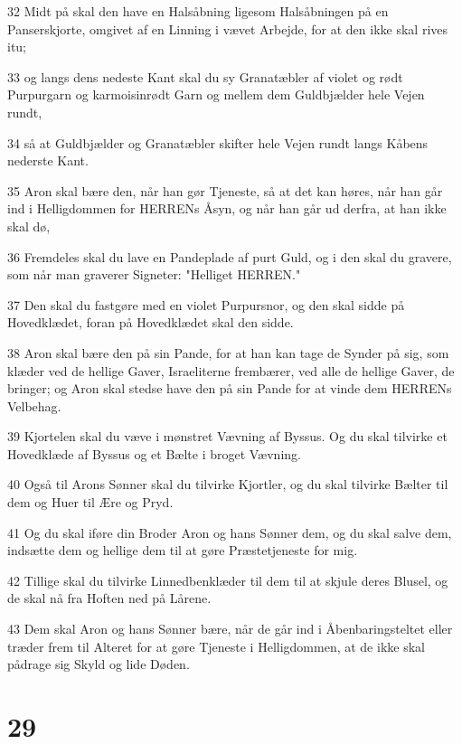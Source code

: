\par 32 Midt på skal den have en Halsåbning ligesom Halsåbningen på en Panserskjorte, omgivet af en Linning i vævet Arbejde, for at den ikke skal rives itu;
\par 33 og langs dens nedeste Kant skal du sy Granatæbler af violet og rødt Purpurgarn og karmoisinrødt Garn og mellem dem Guldbjælder hele Vejen rundt,
\par 34 så at Guldbjælder og Granatæbler skifter hele Vejen rundt langs Kåbens nederste Kant.
\par 35 Aron skal bære den, når han gør Tjeneste, så at det kan høres, når han går ind i Helligdommen for HERRENs Åsyn, og når han går ud derfra, at han ikke skal dø,
\par 36 Fremdeles skal du lave en Pandeplade af purt Guld, og i den skal du gravere, som når man graverer Signeter: "Helliget HERREN."
\par 37 Den skal du fastgøre med en violet Purpursnor, og den skal sidde på Hovedklædet, foran på Hovedklædet skal den sidde.
\par 38 Aron skal bære den på sin Pande, for at han kan tage de Synder på sig, som klæder ved de hellige Gaver, Israeliterne frembærer, ved alle de hellige Gaver, de bringer; og Aron skal stedse have den på sin Pande for at vinde dem HERRENs Velbehag.
\par 39 Kjortelen skal du væve i mønstret Vævning af Byssus. Og du skal tilvirke et Hovedklæde af Byssus og et Bælte i broget Vævning.
\par 40 Også til Arons Sønner skal du tilvirke Kjortler, og du skal tilvirke Bælter til dem og Huer til Ære og Pryd.
\par 41 Og du skal iføre din Broder Aron og hans Sønner dem, og du skal salve dem, indsætte dem og hellige dem til at gøre Præstetjeneste for mig.
\par 42 Tillige skal du tilvirke Linnedbenklæder til dem til at skjule deres Blusel, og de skal nå fra Hoften ned på Lårene.
\par 43 Dem skal Aron og hans Sønner bære, når de går ind i Åbenbaringsteltet eller træder frem til Alteret for at gøre Tjeneste i Helligdommen, at de ikke skal pådrage sig Skyld og lide Døden.

\chapter{29}

